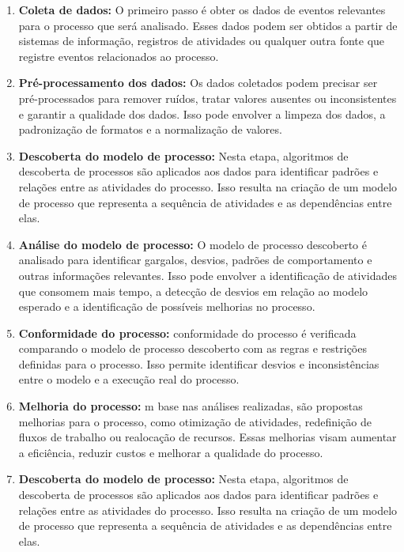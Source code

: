 \documentclass[tcc2]{classe_uftex/uftex}
\begin{document}
\begin{enumerate}
    \item \textbf{Coleta de dados:} O primeiro passo é obter os dados de eventos relevantes para o processo que será analisado. Esses dados podem ser obtidos a partir de sistemas de informação, registros de atividades ou qualquer outra fonte que registre eventos relacionados ao processo.\cite{van2012process}

    \item \textbf{Pré-processamento dos dados:}  Os dados coletados podem precisar ser pré-processados para remover ruídos, tratar valores ausentes ou inconsistentes e garantir a qualidade dos dados. Isso pode envolver a limpeza dos dados, a padronização de formatos e a normalização de valores.\cite{van2012process}
    
    \item \textbf{Descoberta do modelo de processo: } Nesta etapa, algoritmos de descoberta de processos são aplicados aos dados para identificar padrões e relações entre as atividades do processo. Isso resulta na criação de um modelo de processo que representa a sequência de atividades e as dependências entre elas.\cite{van2012process}

      \item \textbf{Análise do modelo de processo: } O modelo de processo descoberto é analisado para identificar gargalos, desvios, padrões de comportamento e outras informações relevantes. Isso pode envolver a identificação de atividades que consomem mais tempo, a detecção de desvios em relação ao modelo esperado e a identificação de possíveis melhorias no processo.\cite{van2012process}

       \item \textbf{Conformidade do processo:} conformidade do processo é verificada comparando o modelo de processo descoberto com as regras e restrições definidas para o processo. Isso permite identificar desvios e inconsistências entre o modelo e a execução real do processo.\cite{van2012process}


        \item \textbf{Melhoria do processo:} m base nas análises realizadas, são propostas melhorias para o processo, como otimização de atividades, redefinição de fluxos de trabalho ou realocação de recursos. Essas melhorias visam aumentar a eficiência, reduzir custos e melhorar a qualidade do processo.\cite{van2012process}

          \item \textbf{Descoberta do modelo de processo: } Nesta etapa, algoritmos de descoberta de processos são aplicados aos dados para identificar padrões e relações entre as atividades do processo. Isso resulta na criação de um modelo de processo que representa a sequência de atividades e as dependências entre elas.\cite{van2012process}


\end{enumerate}
\end{document}
